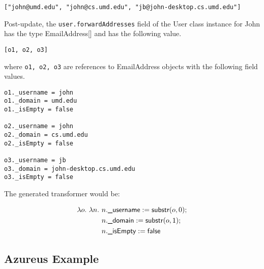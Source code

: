 \texttt{["john@umd.edu", "john@cs.umd.edu", "jb@john-desktop.cs.umd.edu"]}

Post-update, the \texttt{user.forwardAddresses} field of the User
class instance for John has the type EmailAddress[] and has the
following value.

\texttt{[o1, o2, o3]}

where \texttt{o1, o2, o3} are references to EmailAddress objects with
the following field values.

\begin{verbatim}
o1._username = john
o1._domain = umd.edu
o1._isEmpty = false

o2._username = john
o2._domain = cs.umd.edu
o2._isEmpty = false

o3._username = jb
o3._domain = john-desktop.cs.umd.edu
o3._isEmpty = false
\end{verbatim}

The generated transformer would be:

\begin{align*}
\lambda o.\ \lambda n.\ &n.\textsf{\_username} := \textsf{substr}(o,0);\\ &n.\textsf{\_domain} := \textsf{substr}(o,1);\\ &n.\textsf{\_isEmpty} := \textsf{false}
\end{align*}

\subsection{Azureus Example}



